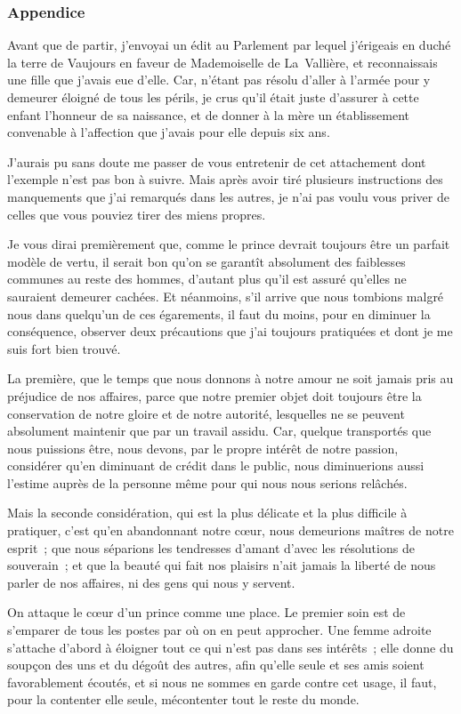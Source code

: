 \documentclass[french,twoside]{book} %
\begin{document}
\subsubsection[{Appendice}]{Appendice}
\noindent Avant que de partir, j’envoyai un édit au Parlement par lequel j’érigeais en duché la terre de Vaujours en faveur de Mademoiselle de La Vallière, et reconnaissais une fille que j’avais eue d’elle. Car, n’étant pas résolu d’aller à l’armée pour y demeurer éloigné de tous les périls, je crus qu’il était juste d’assurer à cette enfant l’honneur de sa naissance, et de donner à la mère un établissement convenable à l’affection que j’avais pour elle depuis six ans.\par
J’aurais pu sans doute me passer de vous entretenir de cet attachement dont l’exemple n’est pas bon à suivre. Mais après avoir tiré plusieurs instructions des manquements que j’ai remarqués dans les autres, je n’ai pas voulu vous priver de celles que vous pouviez tirer des miens propres.\par
Je vous dirai premièrement que, comme le prince devrait toujours être un parfait modèle de vertu, il serait bon qu’on se garantît absolument des faiblesses communes au reste des hommes, d’autant plus qu’il est assuré qu’elles ne sauraient demeurer cachées. Et néanmoins, s’il arrive que nous tombions malgré nous dans quelqu’un de ces égarements, il faut du moins, pour en diminuer la conséquence, observer deux précautions que j’ai toujours pratiquées et dont je me suis fort bien trouvé.\par
La première, que le temps que nous donnons à notre amour ne soit jamais pris au préjudice de nos affaires, parce que notre premier objet doit toujours être la conservation de notre gloire et de notre autorité, lesquelles ne se peuvent absolument maintenir que par un travail assidu. Car, quelque transportés que nous puissions être, nous devons, par le propre intérêt de notre passion, considérer qu’en diminuant de crédit dans le public, nous diminuerions aussi l’estime auprès de la personne même pour qui nous nous serions relâchés.\par
Mais la seconde considération, qui est la plus délicate et la plus difficile à pratiquer, c’est qu’en abandonnant notre cœur, nous demeurions maîtres de notre esprit ; que nous séparions les tendresses d’amant d’avec les résolutions de souverain ; et que la beauté qui fait nos plaisirs n’ait jamais la liberté de nous parler de nos affaires, ni des gens qui nous y servent.\par
On attaque le cœur d’un prince comme une place. Le premier soin est de s’emparer de tous les postes par où on en peut approcher. Une femme adroite s’attache d’abord à éloigner tout ce qui n’est pas dans ses intérêts ; elle donne du soupçon des uns et du dégoût des autres, afin qu’elle seule et ses amis soient favorablement écoutés, et si nous ne sommes en garde contre cet usage, il faut, pour la contenter elle seule, mécontenter tout le reste du monde.\par
\end{document}
